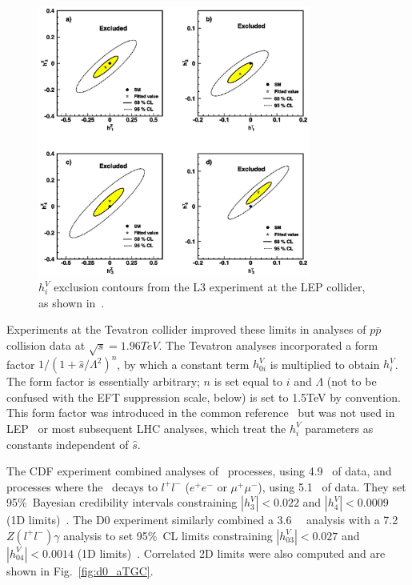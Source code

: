 \documentclass[oneside, letterpaper, 12pt, oldfontcommands]{memoir}
\begin{document}
\begin{figure}[hbtp]
  \begin{center}
    \includegraphics[width=0.8\textwidth]{Figures/L3_atgc_contours.jpg}
    \caption{
      $h_{i}^{V}$ exclusion contours from the L3 experiment at the LEP collider, as shown in~\cite{ref:j.physletb.2004.07.002}.
    }
    \label{fig:L3_atgc_contours}
  \end{center}
\end{figure}

Experiments at the Tevatron collider improved these limits in analyses of $p\bar{p}$ collision data at $\sqrt{s} = 1.96\unit{TeV}$.
The Tevatron analyses incorporated a form factor $1 / (1 + \hat{s}/\Lambda^{2})^{n}$, by which a constant term $h_{0i}^{V}$ is
multiplied to obtain $h_{i}^{V}$.
The form factor is essentially arbitrary; $n$ is set equal to $i$ and $\Lambda$ (not to be confused with the EFT suppression scale, below)
is set to 1.5\unit{TeV} by convention. This form factor was introduced in the common reference~\cite{ref:PhysRevD.47.4889} but was not used in LEP~\cite{ref:j.physrep.2013.07.004}
or most subsequent LHC analyses, which treat the $h_{i}^{V}$ parameters as constants independent of $\hat{s}$.

The CDF experiment combined analyses of \zinvg\ processes, using 4.9 \fbinv\ of data, and processes where the \PZ\ decays to
$l^\mathrm{+}l^\mathrm{-}$ ($e^\mathrm{+}e^\mathrm{-}$ or $\mu^\mathrm{+}\mu^\mathrm{-}$), using 5.1 \fbinv\ of data.
They set 95\%\ Bayesian credibility intervals constraining $|h_{3}^{V}| < 0.022$ and $|h_{4}^{V}| < 0.0009$ (1D limits)~\cite{ref:PhysRevLett.107.051802}.
The D0 experiment similarly combined a 3.6 \fbinv\ \zinvg\ analysis with a 7.2
\fbinv\ $Z(l^\mathrm{+}l^\mathrm{-})\gamma$ analysis to set 95\%\ CL limits constraining
$|h_{03}^{V}| < 0.027$ and $|h_{04}^{V}| < 0.0014$ (1D limits)~\cite{ref:PhysRevD.85.052001}. Correlated 2D limits were also
computed and are shown in Fig.~\ref{fig:d0_aTGC}.
\end{document}

